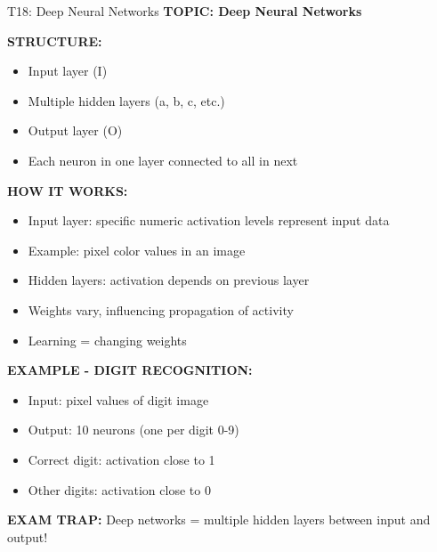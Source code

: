 \documentclass[8pt]{beamer}
\begin{document}
	\begin{frame}{T18: Deep Neural Networks}
		\fontsize{6.5}{7.5}\selectfont
		\textbf{TOPIC: Deep Neural Networks}
		
		\vspace{0.1cm}
		\textbf{STRUCTURE:}
		\begin{itemize}
			\item Input layer (I)
			\item Multiple hidden layers (a, b, c, etc.)
			\item Output layer (O)
			\item Each neuron in one layer connected to all in next
		\end{itemize}
		
		\vspace{0.1cm}
		\textbf{HOW IT WORKS:}
		\begin{itemize}
			\item Input layer: specific numeric activation levels represent input data
			\item Example: pixel color values in an image
			\item Hidden layers: activation depends on previous layer
			\item Weights vary, influencing propagation of activity
			\item Learning = changing weights
		\end{itemize}
		
		\vspace{0.1cm}
		\textbf{EXAMPLE - DIGIT RECOGNITION:}
		\begin{itemize}
			\item Input: pixel values of digit image
			\item Output: 10 neurons (one per digit 0-9)
			\item Correct digit: activation close to 1
			\item Other digits: activation close to 0
		\end{itemize}
		
		\textcolor{myred}{\textbf{EXAM TRAP:}} Deep networks = \textcolor{myblue}{multiple hidden layers} between input and output!
	\end{frame}
	
\end{document}
